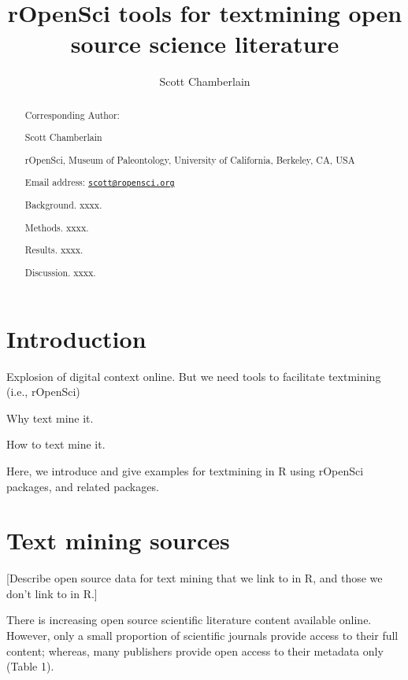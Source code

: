 \documentclass[author-year, review, 11pt]{components/elsarticle} %
\begin{document}
\begin{frontmatter}

  \title{rOpenSci tools for textmining open source science literature}
    \author[cstar]{Scott Chamberlain}
      \address[cstar]{rOpenSci, Museum of Paleontology, University of California, Berkeley,
CA, USA}
  
  \begin{abstract}
  Corresponding Author:
  
  Scott Chamberlain
  
  rOpenSci, Museum of Paleontology, University of California, Berkeley,
  CA, USA
  
  Email address:
  \href{mailto:scott@ropensci.org}{\nolinkurl{scott@ropensci.org}}
  
  \newpage
  
  Background. xxxx.
  
  Methods. xxxx.
  
  Results. xxxx.
  
  Discussion. xxxx.
  \end{abstract}
  
 \end{frontmatter}


\newpage

\section{Introduction}\label{introduction}

Explosion of digital context online. But we need tools to facilitate
textmining (i.e., rOpenSci)

Why text mine it.

How to text mine it.

Here, we introduce and give examples for textmining in R using rOpenSci
packages, and related packages.

\section{Text mining sources}\label{text-mining-sources}

{[}Describe open source data for text mining that we link to in R, and
those we don't link to in R.{]}

There is increasing open source scientific literature content available
online. However, only a small proportion of scientific journals provide
access to their full content; whereas, many publishers provide open
access to their metadata only (Table 1).
\end{document}
